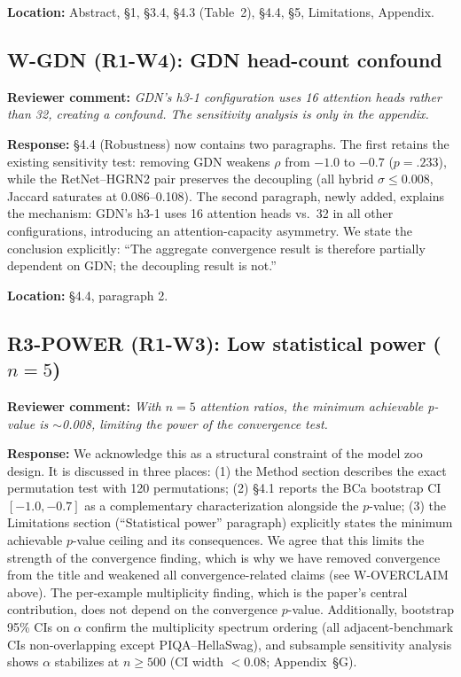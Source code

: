 \documentclass[11pt]{article}
\newcommand{\reviewer}[1]{\textcolor{reviewercolor}{\textbf{Reviewer comment:} \textit{#1}}}
\newcommand{\response}[1]{\textcolor{responsecolor}{\textbf{Response:} #1}}
\newcommand{\location}[1]{\textbf{Location:} #1}
\begin{document}
\location{Abstract, \S1, \S3.4, \S4.3 (Table~2), \S4.4, \S5, Limitations, Appendix.}

\subsection*{W-GDN (R1-W4): GDN head-count confound}

\reviewer{GDN's h3-1 configuration uses 16 attention heads rather than 32, creating a confound. The sensitivity analysis is only in the appendix.}

\response{\S4.4 (Robustness) now contains two paragraphs. The first retains the existing sensitivity test: removing GDN weakens $\rho$ from $-1.0$ to $-0.7$ ($p = .233$), while the RetNet--HGRN2 pair preserves the decoupling (all hybrid $\sigma \leq 0.008$, Jaccard saturates at 0.086--0.108). The second paragraph, newly added, explains the mechanism: GDN's h3-1 uses 16 attention heads vs.\ 32 in all other configurations, introducing an attention-capacity asymmetry. We state the conclusion explicitly: ``The aggregate convergence result is therefore partially dependent on GDN; the decoupling result is not.''}

\location{\S4.4, paragraph 2.}

\subsection*{R3-POWER (R1-W3): Low statistical power ($n = 5$)}

\reviewer{With $n = 5$ attention ratios, the minimum achievable p-value is $\sim$0.008, limiting the power of the convergence test.}

\response{We acknowledge this as a structural constraint of the model zoo design. It is discussed in three places: (1) the Method section describes the exact permutation test with 120 permutations; (2) \S4.1 reports the BCa bootstrap CI $[-1.0, -0.7]$ as a complementary characterization alongside the $p$-value; (3) the Limitations section (``Statistical power'' paragraph) explicitly states the minimum achievable $p$-value ceiling and its consequences. We agree that this limits the strength of the convergence finding, which is why we have removed convergence from the title and weakened all convergence-related claims (see W-OVERCLAIM above). The per-example multiplicity finding, which is the paper's central contribution, does not depend on the convergence $p$-value. Additionally, bootstrap 95\% CIs on $\alpha$ confirm the multiplicity spectrum ordering (all adjacent-benchmark CIs non-overlapping except PIQA--HellaSwag), and subsample sensitivity analysis shows $\alpha$ stabilizes at $n \geq 500$ (CI width $< 0.08$; Appendix~\S G).}
\end{document}
